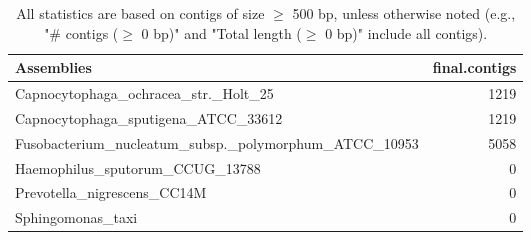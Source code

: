 \documentclass[12pt,a4paper]{article}
\begin{document}
\begin{table}[ht]
\begin{center}
\caption{All statistics are based on contigs of size $\geq$ 500 bp, unless otherwise noted (e.g., "\# contigs ($\geq$ 0 bp)" and "Total length ($\geq$ 0 bp)" include all contigs).}
\begin{tabular}{|l*{1}{|r}|}
\hline
Assemblies & final.contigs \\ \hline
Capnocytophaga\_ochracea\_str.\_Holt\_25 & 1219 \\ \hline
Capnocytophaga\_sputigena\_ATCC\_33612 & 1219 \\ \hline
Fusobacterium\_nucleatum\_subsp.\_polymorphum\_ATCC\_10953 & 5058 \\ \hline
Haemophilus\_sputorum\_CCUG\_13788 & 0 \\ \hline
Prevotella\_nigrescens\_CC14M & 0 \\ \hline
Sphingomonas\_taxi & 0 \\ \hline
\end{tabular}
\end{center}
\end{table}
\end{document}
